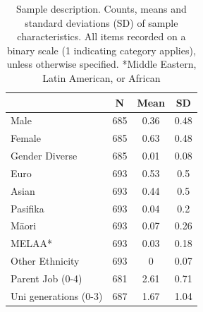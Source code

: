 \begin{table}[h]
\centering

\label{tab:Sample}       %
\begin{tabular}{lccc}
\hline
                                                             & N   & Mean & SD   \\ \hline
Male                                                         & 685 & 0.36 & 0.48 \\
Female                                                       & 685 & 0.63 & 0.48 \\
Gender Diverse                                               & 685 & 0.01 & 0.08 \\
Euro                                                         & 693 & 0.53 & 0.5  \\
Asian                                                        & 693 & 0.44 & 0.5  \\
Pasifika                                                      & 693 & 0.04 & 0.2  \\
M\={a}ori                                                        & 693 & 0.07 & 0.26 \\
MELAA*                                                        & 693 & 0.03 & 0.18 \\
Other Ethnicity                                               & 693 & 0    & 0.07 \\
Parent Job  (0-4) & 681 & 2.61 & 0.71 \\
Uni generations (0-3)                                        & 687 & 1.67 & 1.04 \\ \hline
\end{tabular}
\caption{Sample description. Counts, means and standard deviations (SD) of sample characteristics. All items recorded on a binary scale (1 indicating category applies), unless otherwise specified. *Middle Eastern, Latin American, or African} 
\end{table}

